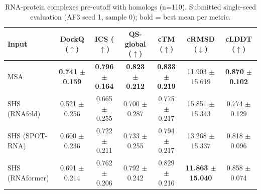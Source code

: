 \begin{table}[htbp]
\centering
\caption{RNA-protein complexes pre-cutoff with homologs (n=110). Submitted single-seed evaluation (AF3 seed 1, sample 0); bold = best mean per metric.}
\label{tab:rna_protein_complexes_pre_cutoff_with_homologs}
\begin{tabular}{lcccccc}
\toprule
Input & DockQ ($\uparrow$) & ICS ($\uparrow$) & QS-global ($\uparrow$) & cTM ($\uparrow$) & cRMSD ($\downarrow$) & cLDDT ($\uparrow$) \\
\midrule
MSA & \textbf{0.741 $\pm$ 0.159} & \textbf{0.796 $\pm$ 0.164} & \textbf{0.823 $\pm$ 0.212} & \textbf{0.833 $\pm$ 0.219} & 11.903 $\pm$ 15.619 & \textbf{0.870 $\pm$ 0.102} \\
SHS (RNAfold) & 0.521 $\pm$ 0.256 & 0.665 $\pm$ 0.255 & 0.700 $\pm$ 0.287 & 0.775 $\pm$ 0.217 & 15.851 $\pm$ 15.343 & 0.774 $\pm$ 0.129 \\
SHS (SPOT-RNA) & 0.600 $\pm$ 0.236 & 0.722 $\pm$ 0.211 & 0.733 $\pm$ 0.255 & 0.794 $\pm$ 0.217 & 13.268 $\pm$ 15.337 & 0.818 $\pm$ 0.096 \\
SHS (RNAformer) & 0.691 $\pm$ 0.214 & 0.762 $\pm$ 0.206 & 0.792 $\pm$ 0.242 & 0.829 $\pm$ 0.216 & \textbf{11.863 $\pm$ 15.040} & 0.858 $\pm$ 0.074 \\
\bottomrule
\end{tabular}
\end{table}
